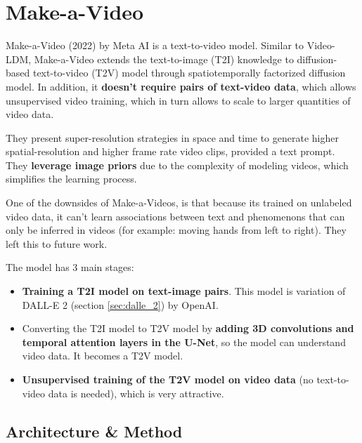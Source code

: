 \section{Make-a-Video}
\label{sec:make_a_video}

Make-a-Video \cite{make_a_video} (2022) by Meta AI is a text-to-video model. Similar to Video-LDM, Make-a-Video extends the text-to-image (T2I) knowledge to diffusion-based text-to-video (T2V) model through spatiotemporally factorized diffusion model. In addition, it \textbf{doesn't require pairs of text-video data}, which allows unsupervised video training, which in turn allows to scale to larger quantities of video data.

They present super-resolution strategies in space and time to generate higher spatial-resolution and higher frame rate video clips, provided a text prompt. They \textbf{leverage image priors} due to the complexity of modeling videos, which simplifies the learning process.

One of the downsides of Make-a-Videos, is that because its trained on unlabeled video data, it can't learn associations between text and phenomenons that can only be inferred in videos (for example: moving hands from left to right). They left this to future work.

The model has 3 main stages:

\begin{itemize}
    \item \textbf{Training a T2I model on text-image pairs}. This model is variation of DALL-E 2 \cite{dalle_2} (section \ref{sec:dalle_2}) by OpenAI.
    \item Converting the T2I model to T2V model by \textbf{adding 3D convolutions and temporal attention layers in the U-Net}, so the model can understand video data. It becomes a T2V model.
    \item \textbf{Unsupervised training of the T2V model on video data} (no text-to-video data is needed), which is very attractive.
\end{itemize}



\subsection{Architecture \& Method}

